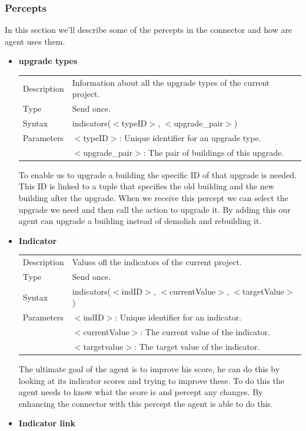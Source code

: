 \subsubsection{Percepts}
In this section we'll describe some of the percepts in the connector and how are agent uses them.

\begin{itemize}
	\item \textbf{upgrade types} \\ 
	\begin{tabular}{ l l }
 		 Description & Information about all the upgrade types of the current project.  \\
  		Type & Send once. \\
 		 Syntax & indicators($<$typeID$>$, $<$upgrade\_pair$>$) \\
  		Parameters &  $<$typeID$>$: Unique identifier for an upgrade type. 
				\\& $<$upgrade\_pair$>$: The pair of buildings of this upgrade. 
	\end{tabular}
	To enable us to upgrade a building the specific ID of that upgrade is needed. This ID is linked to a tuple that specifies the old building and the new building after the upgrade. When we receive this percept we can select the upgrade we need and then call the action to upgrade it. By adding this our agent can upgrade a building instead of demolish and rebuilding it.
	\item \textbf{Indicator} \\ 
	\begin{tabular}{ l l }
 		 Description & Values ofl the indicators of the current project.  \\
  		Type & Send once. \\
 		 Syntax & indicators($<$indID$>$, $<$currentValue$>$, $<$targetValue$>$) \\
  		Parameters &  $<$indID$>$: Unique identifier for an indicator. 
				\\& $<$currentValue$>$: The current value of the indicator. 
				\\& $<$targetvalue$>$: The target value of the indicator. 
	\end{tabular}
	The ultimate goal of the agent is to improve his score, he can do this by looking at its indicator scores and trying to improve these. To do this the agent needs to know what the score is and percept any changes. By enhancing the connector with this percept the agent is able to do this.
	\item \textbf{Indicator link} \\ 

\end{itemize}
